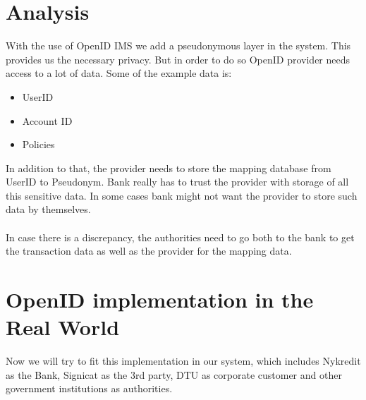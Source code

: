 \section{Analysis}
With the use of OpenID IMS we add a pseudonymous layer in the system. This provides us the necessary privacy. But in order to do so OpenID provider needs access to a lot of data. Some of the example data is:
\begin{itemize}
	\item UserID
	\item Account ID 
	\item Policies	
\end{itemize}
In addition to that, the provider needs to store the mapping database from UserID to Pseudonym. Bank really has to trust the provider with storage of all this sensitive data. In some cases bank might not want the provider to store such data by themselves.
\\
\\In case there is a discrepancy, the authorities need to go both to the bank to get the transaction data as well as the provider for the mapping data.
\section {OpenID implementation in the Real World}
Now we will try to fit this implementation in our system, which includes Nykredit as the Bank, Signicat as the 3rd party, DTU as corporate customer and other government institutions as authorities.
